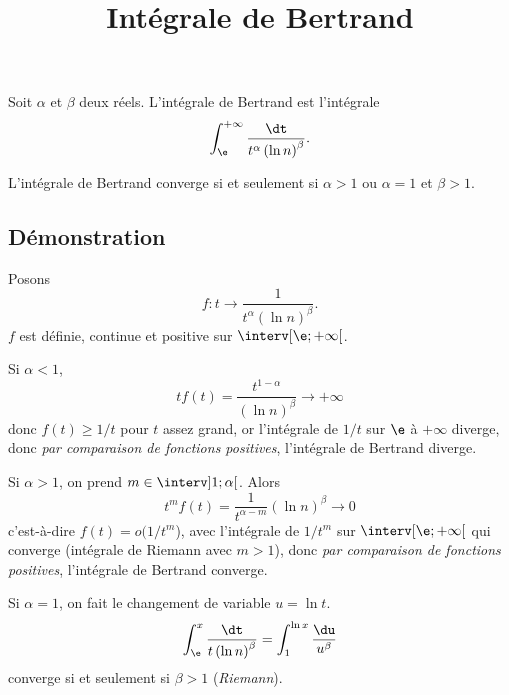 \documentclass[fontsize=12pt,twoside=false,parskip=half]{scrartcl}
\title{Intégrale de Bertrand}
\date{}
\author{}
\begin{document}
\maketitle
    Soit $\alpha$ et $\beta$ deux réels. L’intégrale de Bertrand est l’intégrale
   \[
      \int_{\e}^{+\infty} \frac{\dt}{t^\alpha \left(\ln n \right)^\beta}.
   \]
   \begin{Theoreme}
      L’intégrale de Bertrand converge si et seulement si $\alpha > 1$ ou $\alpha = 1$ et $\beta > 1$.
   \end{Theoreme}
   \subsection{Démonstration}
      Posons
      \[
         f \colon t \to \frac{1}{t^\alpha \left(\ln n \right)^\beta}.
      \]
      $f$ est définie, continue et positive sur $\interv[\e ; +\infty[$.
      
      Si $\alpha < 1$,
      \[
         tf(t) = \frac{t^{1 -\alpha}}{\left(\ln n \right)^\beta} \to +\infty
      \]
      donc $f(t) \geq 1/t$ pour $t$ assez grand, or l’intégrale de $1/t$ sur $\e$ à $+\infty$ diverge, donc \emph{par comparaison de fonctions positives}, l’intégrale de Bertrand diverge.
      
      Si $\alpha > 1$, on prend $m \in \interv]1; \alpha[$. Alors
      \[
         t^mf(t) = \frac{1}{t^{\alpha - m}}{\left(\ln n \right)^\beta} \to 0
      \]
      c’est-à-dire $f(t) = o(1/t^m$), avec l’intégrale de $1/t^m$ sur $\interv[\e ; +\infty[$ qui converge (intégrale de Riemann avec $m > 1$), donc \emph{par comparaison de fonctions positives}, l’intégrale de Bertrand converge.
         
      Si $\alpha = 1$, on fait le changement de variable $u = \ln t$.
      \[
         \int_{\e}^x \frac{\dt}{t \left(\ln n \right)^\beta} = \int_1^{\ln x} \frac{\du}{u^\beta}
      \]
      converge si et seulement si $\beta > 1$ (\emph{Riemann}).
   
\end{document}
